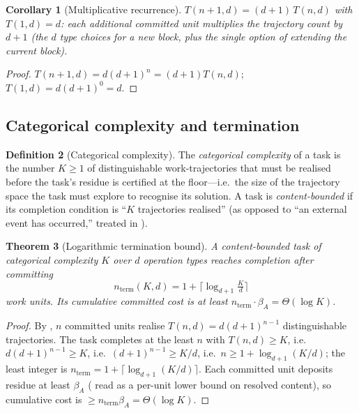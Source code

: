 \documentclass[twocolumn,10pt,a4paper]{article}
\theoremstyle{thmstyle}
\newtheorem{theorem}{Theorem}[section]
\newtheorem{corollary}[theorem]{Corollary}
\theoremstyle{definition}
\newtheorem{definition}[theorem]{Definition}
\theoremstyle{remark}
\newcommand{\floor}{\beta}
\begin{document}
\begin{corollary}[Multiplicative recurrence]
\label{cor:recurrence}
$T(n{+}1,d)=(d+1)\,T(n,d)$ with $T(1,d)=d$: each additional committed
unit multiplies the trajectory count by $d+1$ (the $d$ type choices for a
new block, plus the single option of extending the current block).
\end{corollary}

\begin{proof}
$T(n{+}1,d)=d(d+1)^{n}=(d+1)T(n,d)$; $T(1,d)=d(d+1)^0=d$.
\end{proof}

\subsection{Categorical complexity and termination}

\begin{definition}[Categorical complexity]
\label{def:complexity}
The \emph{categorical complexity} of a task is the number $K\ge 1$ of
distinguishable work-trajectories that must be realised before the task's
residue is certified at the floor---i.e.\ the size of the trajectory
space the task must explore to recognise its solution. A task is
\emph{content-bounded} if its completion condition is ``$K$ trajectories
realised'' (as opposed to ``an external event has occurred,'' treated in
).
\end{definition}

\begin{theorem}[Logarithmic termination bound]
\label{thm:termination}
A content-bounded task of categorical complexity $K$ over $d$ operation
types reaches completion after committing
\[
n_{\mathrm{term}}(K,d)=1+\Big\lceil\log_{d+1}\!\tfrac{K}{d}\Big\rceil
\]
work units. Its cumulative committed cost is at least
$n_{\mathrm{term}}\cdot\floor_A=\Theta(\log K)$.
\end{theorem}

\begin{proof}
By , $n$ committed units realise $T(n,d)=d(d+1)^{n-1}$
distinguishable trajectories. The task completes at the least $n$ with
$T(n,d)\ge K$, i.e.\ $d(d+1)^{n-1}\ge K$, i.e.\ $(d+1)^{n-1}\ge K/d$,
i.e.\ $n\ge 1+\log_{d+1}(K/d)$; the least integer is
$n_{\mathrm{term}}=1+\lceil\log_{d+1}(K/d)\rceil$. Each committed unit
deposits residue at least $\floor_A$ ( read as a
per-unit lower bound on resolved content), so cumulative cost is
$\ge n_{\mathrm{term}}\floor_A=\Theta(\log K)$.
\end{proof}
\end{document}
